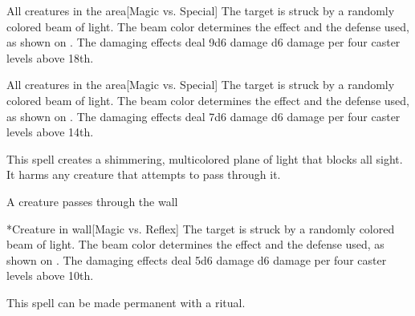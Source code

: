 \begin{spellheader}
\end{spellheader}
\begin{spelleffects}
    \begin{spelltargets}{All creatures in the area}[Magic vs. Special]
        \spellspecial The target is struck by a randomly colored beam of light. The beam color determines the effect and the defense used, as shown on . The damaging effects deal 9d6 damage \add d6 damage per four caster levels above 18th.
    \end{spelltargets}
\end{spelleffects}

\begin{spellheader}
\end{spellheader}
\begin{spelleffects}
    \begin{spelltargets}{All creatures in the area}[Magic vs. Special]
        \spellspecial The target is struck by a randomly colored beam of light. The beam color determines the effect and the defense used, as shown on . The damaging effects deal 7d6 damage \add d6 damage per four caster levels above 14th.
    \end{spelltargets}
\end{spelleffects}

\begin{spellheader}
    \spelldur{\durshort \dismissable}
\end{spellheader}
\begin{spelleffects}
    \spelleffect This spell creates a shimmering, multicolored plane of light that blocks all sight. It harms any creature that attempts to pass through it.
    \begin{spelltrigger}{A creature passes through the wall}
        \begin{spelltarget}*{Creature in wall}[Magic vs. Reflex]
            \spellspecial The target is struck by a randomly colored beam of light. The beam color determines the effect and the defense used, as shown on . The damaging effects deal 5d6 damage \add d6 damage per four caster levels above 10th.
        \end{spelltarget}
    \end{spelltrigger}
\end{spelleffects}
\begin{spellfooter}
    \spellnotes This spell can be made permanent with a  ritual.
\end{spellfooter}

